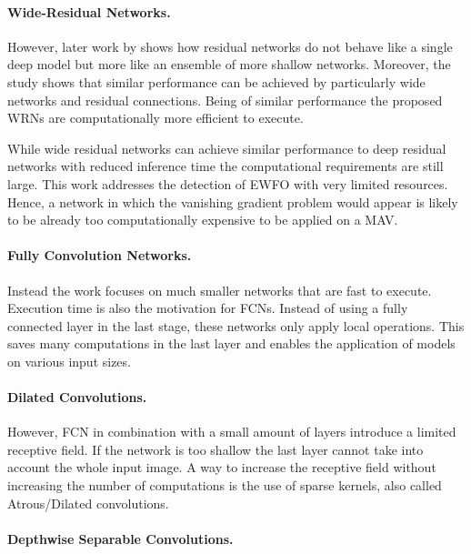 \paragraph{Wide-Residual Networks.}

However, later work by \citeauthor{Zagoruyko2016} \cite{Zagoruyko2016} shows how residual networks do not behave like a single deep model but more like an ensemble of more shallow networks. Moreover, the study shows that similar performance can be achieved by particularly wide networks and residual connections. Being of similar performance the proposed \acp{WRN} are computationally more efficient to execute.

While wide residual networks can achieve similar performance to deep residual networks with reduced inference time the computational requirements are still large. This work addresses the detection of \ac{EWFO} with very limited resources. Hence, a network in which the vanishing gradient problem would appear is likely to be already too computationally expensive to be applied on a \ac{MAV}.

\paragraph{Fully Convolution Networks.}

Instead the work focuses on much smaller networks that are fast to execute. Execution time is also the motivation for \acp{FCN}. Instead of using a fully connected layer in the last stage, these networks only apply local operations. This saves many computations in the last layer and enables the application of models on various input sizes.

\paragraph{Dilated Convolutions.}

However, \ac{FCN} in combination with a small amount of layers introduce a limited receptive field. If the network is too shallow the last layer cannot take into account the whole input image. A way to increase the receptive field without increasing the number of computations is the use of sparse kernels, also called Atrous/Dilated convolutions.

\paragraph{Depthwise Separable Convolutions.}

